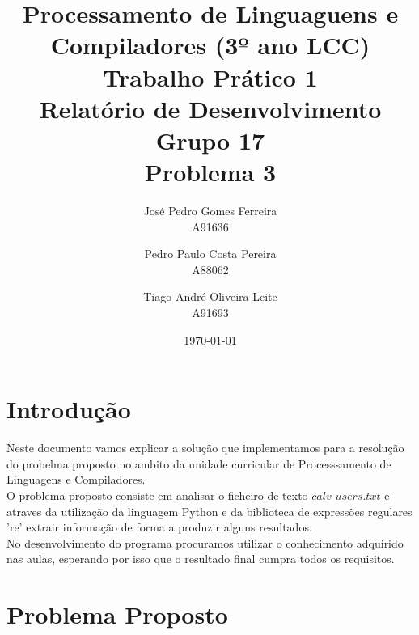 \documentclass[11pt,a4paper]{report}%
\title{Processamento de Linguaguens e Compiladores (3º ano LCC)\\
       \textbf{Trabalho Prático 1}\\ Relatório de Desenvolvimento \\ \textbf{Grupo 17}\\ Problema 3
       } %
\author{José Pedro Gomes Ferreira\\ A91636 \\  \and Pedro Paulo Costa Pereira\\ A88062
         \and Tiago André Oliveira Leite\\ A91693
       } %
\date{\today} %
\begin{document}
\maketitle %


\tableofcontents %




\chapter{Introdução} \label{chap:intro} %

Neste documento vamos explicar a solução que implementamos para a resolução do probelma proposto no ambito da unidade curricular de Processsamento de Linguagens e Compiladores. \\
O problema proposto consiste em analisar o ficheiro de texto $calv$-$users.txt$ e atraves da utilização da linguagem Python e da biblioteca de expressões regulares 're' extrair informação de forma a produzir alguns resultados.\\No desenvolvimento do programa procuramos utilizar o conhecimento adquirido nas aulas, esperando por isso que o resultado final cumpra todos os requisitos. 





\chapter{Problema Proposto} \label{chap:ProbelemaProposto} %
\end{document}
